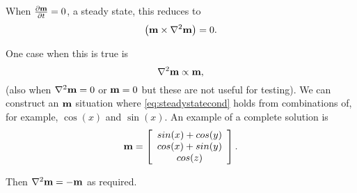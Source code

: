 When $\frac{\partial \mathbf{m}}{\partial t} = 0$, \ie a steady state, this reduces to
\begin{equation}
   \left( \mathbf{m} \times \nabla^2 \mathbf{m} \right) = 0.
\end{equation}

One case when this is true is
\begin{equation}
  \nabla^2 \mathbf{m} \propto \mathbf{m},
  \label{eq:steadystatecond}
\end{equation}
(also when $\nabla^2 \mathbf{m} = 0$ or $\mathbf{m} = 0$ but these are not useful for testing).
We can construct an $\mathbf{m}$ situation where \eqref{eq:steadystatecond} holds from combinations of, for example, $\cos(x)$ and $\sin(x)$.
An example of a complete solution is
\begin{equation}
  \mathbf{m} = \left[
    \begin{array}{c}
      sin(x) + cos(y) \\ cos(x) + sin(y) \\ cos(z)
    \end{array}
    \right].
\end{equation}

Then $\nabla^2 \mathbf{m} = - \mathbf{m}$ as required.
